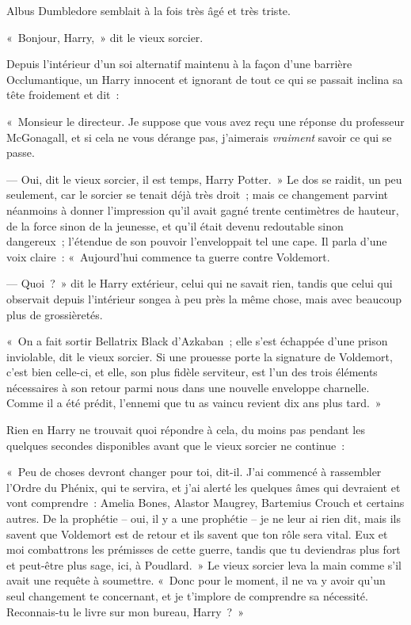 Albus Dumbledore semblait à la fois très âgé et très triste.

«~Bonjour, Harry,~» dit le vieux sorcier.

Depuis l'intérieur d'un soi alternatif maintenu à la façon d'une barrière Occlumantique, un Harry innocent et ignorant de tout ce qui se passait inclina sa tête froidement et dit~:

«~Monsieur le directeur.
Je suppose que vous avez reçu une réponse du professeur McGonagall, et si cela ne vous dérange pas, j'aimerais \emph{vraiment} savoir ce qui se passe.

--- Oui, dit le vieux sorcier, il est temps, Harry Potter.~»
Le dos se raidit, un peu seulement, car le sorcier se tenait déjà très droit~; mais ce changement parvint néanmoins à donner l'impression qu'il avait gagné trente centimètres de hauteur, de la force sinon de la jeunesse, et qu'il était devenu redoutable sinon dangereux~; l'étendue de son pouvoir l'enveloppait tel une cape.
Il parla d'une voix claire~: «~Aujourd'hui commence ta guerre contre Voldemort.

--- Quoi~?~»
dit le Harry extérieur, celui qui ne savait rien, tandis que celui qui observait depuis l'intérieur songea à peu près la même chose, mais avec beaucoup plus de grossièretés.

«~On a fait sortir Bellatrix Black d'Azkaban~; elle s'est échappée d'une prison inviolable, dit le vieux sorcier.
Si une prouesse porte la signature de Voldemort, c'est bien celle-ci, et elle, son plus fidèle serviteur, est l'un des trois éléments nécessaires à son retour parmi nous dans une nouvelle enveloppe charnelle.
Comme il a été prédit, l'ennemi que tu as vaincu revient dix ans plus tard.~»

Rien en Harry ne trouvait quoi répondre à cela, du moins pas pendant les quelques secondes disponibles avant que le vieux sorcier ne continue~:

«~Peu de choses devront changer pour toi, dit-il.
J'ai commencé à rassembler l'Ordre du Phénix, qui te servira, et j'ai alerté les quelques âmes qui devraient et vont comprendre~: Amelia Bones, Alastor Maugrey, Bartemius Crouch et certains autres.
De la prophétie -- oui, il y a une prophétie -- je ne leur ai rien dit, mais ils savent que Voldemort est de retour et ils savent que ton rôle sera vital.
Eux et moi combattrons les prémisses de cette guerre, tandis que tu deviendras plus fort et peut-être plus sage, ici, à Poudlard.~»
Le vieux sorcier leva la main comme s'il avait une requête à soumettre.
«~Donc pour le moment, il ne va y avoir qu'un seul changement te concernant, et je t'implore de comprendre sa nécessité.
Reconnais-tu le livre sur mon bureau, Harry~?~»

